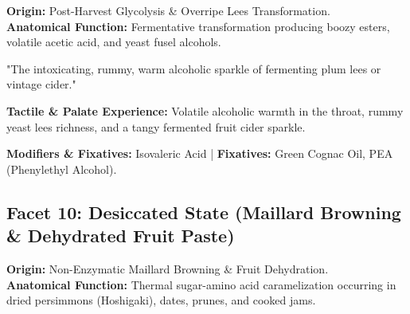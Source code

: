 \documentclass[11pt,a4paper]{article}
\begin{document}
\begin{botanicalbox}
\textbf{Origin:} Post-Harvest Glycolysis \& Overripe Lees Transformation.\\
\textbf{Anatomical Function:} Fermentative transformation producing boozy esters, volatile acetic acid, and yeast fusel alcohols.
\end{botanicalbox}

\begin{sensoryquote}
"The intoxicating, rummy, warm alcoholic sparkle of fermenting plum lees or vintage cider."
\end{sensoryquote}

\begin{flavourbox}
\textbf{Tactile \& Palate Experience:} Volatile alcoholic warmth in the throat, rummy yeast lees richness, and a tangy fermented fruit cider sparkle.
\end{flavourbox}

\begin{table}[htbp]
\centering
\caption{Primary Impact Actors for Facet 9 (Fermentative State)}
\vspace{0.3em}
\end{table}

\textbf{Modifiers \& Fixatives:} Isovaleric Acid | \textbf{Fixatives:} Green Cognac Oil, PEA (Phenylethyl Alcohol).

\vspace{1.5em}

\subsection{Facet 10: Desiccated State (Maillard Browning \& Dehydrated Fruit Paste)}

\begin{botanicalbox}
\textbf{Origin:} Non-Enzymatic Maillard Browning \& Fruit Dehydration.\\
\textbf{Anatomical Function:} Thermal sugar-amino acid caramelization occurring in dried persimmons (Hoshigaki), dates, prunes, and cooked jams.
\end{botanicalbox}
\end{document}
